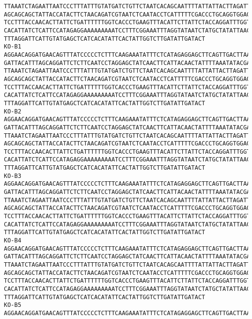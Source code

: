 \documentclass[11pt]{article}
\begin{document}
\begin{Verbatim}[commandchars=\\\{\}]
TTAAATCTAGAATTAATCCCTTTATTTGTATGATCTGTTCTAATCACAGCAATTTTATTATTACTTAGATTACCAGTCTT
AGCAGCAGCTATTACCATACTTCTAACAGATCGTAATCTCAATACCTCATTTTTCGACCCTGCAGGTGGAGGAGACCCAA
TCCTTTACCAACACTTATTCTGATTTTTTGGTCACCCTGAAGTTTACATTCTTATTCTACCAGGATTTGGTATTATTTCT
CACATTATCTCATTCCATAGAGGAAAAAAAAATCCTTTCGGAAATTTAGGTATAATCTATGCTATATTAACTATTGGAAT
TTTAGGATTCATTGTATGAGCTCATCACATATTCACTATTGGTCTTGATATTGATACT
KO-B1
AGGAACAGGATGAACAGTTTATCCCCCTCTTTCAAGAAATATTTCTCATAGAGGAGCTTCAGTTGACTTAAGAATCTTCA
GATTACATTTAGCAGGATTCTCTTCAATCCTAGGAGCTATCAACTTCATTACAACTATTTTAAATATACGACCAAAAAAC
TTAAATCTAGAATTAATCCCTTTATTTGTATGATCTGTTCTAATCACAGCAATTTTATTATTACTTAGATTACCAGTCTT
AGCAGCAGCTATTACCATACTTCTAACAGATCGTAATCTCAATACCTCATTTTTCGACCCTGCAGGTGGAGGAGACCCAA
TCCTTTACCAACACTTATTCTGATTTTTTGGTCACCCTGAAGTTTACATTCTTATTCTACCAGGATTTGGTATTATTTCT
CACATTATCTCATTCCATAGAGGAAAAAAAAATCCTTTCGGAAATTTAGGTATAATCTATGCTATATTAACTATTGGAAT
TTTAGGATTCATTGTATGAGCTCATCACATATTCACTATTGGTCTTGATATTGATACT
KO-B2
AGGAACAGGATGAACAGTTTATCCCCCTCTTTCAAGAAATATTTCTCATAGAGGAGCTTCAGTTGACTTAAGAATCTTCA
GATTACATTTAGCAGGATTCTCTTCAATCCTAGGAGCTATCAACTTCATTACAACTATTTTAAATATACGACCAAAAAAC
TTAAATCTAGAATTAATCCCTTTATTTGTATGATCTGTTCTAATCACAGCAATTTTATTATTACTTAGATTACCAGTCTT
AGCAGCAGCTATTACCATACTTCTAACAGATCGTAATCTCAATACCTCATTTTTCGACCCTGCAGGTGGAGGAGACCCAA
TCCTTTACCAACACTTATTCTGATTTTTTGGTCACCCTGAAGTTTACATTCTTATTCTACCAGGATTTGGTATTATTTCT
CACATTATCTCATTCCATAGAGGAAAAAAAAATCCTTTCGGAAATTTAGGTATAATCTATGCTATATTAACTATTGGAAT
TTTAGGATTCATTGTATGAGCTCATCACATATTCACTATTGGTCTTGATATTGATACT
KO-B3
AGGAACAGGATGAACAGTTTATCCCCCTCTTTCAAGAAATATTTCTCATAGAGGAGCTTCAGTTGACTTAAGAATCTTCA
GATTACATTTAGCAGGATTCTCTTCAATCCTAGGAGCTATCAACTTCATTACAACTATTTTAAATATACGACCAAAAAAC
TTAAATCTAGAATTAATCCCTTTATTTGTATGATCTGTTCTAATCACAGCAATTTTATTATTACTTAGATTACCAGTCTT
AGCAGCAGCTATTACCATACTTCTAACAGATCGTAATCTCAATACCTCATTTTTCGACCCTGCAGGTGGAGGAGACCCAA
TCCTTTACCAACACTTATTCTGATTTTTTGGTCACCCTGAAGTTTACATTCTTATTCTACCAGGATTTGGTATTATTTCT
CACATTATCTCATTCCATAGAGGAAAAAAAAATCCTTTCGGAAATTTAGGTATAATCTATGCTATATTAACTATTGGAAT
TTTAGGATTCATTGTATGAGCTCATCACATATTCACTATTGGTCTTGATATTGATACT
KO-B4
AGGAACAGGATGAACAGTTTATCCCCCTCTTTCAAGAAATATTTCTCATAGAGGAGCTTCAGTTGACTTAAGAATCTTCA
GATTACATTTAGCAGGATTCTCTTCAATCCTAGGAGCTATCAACTTCATTACAACTATTTTAAATATACGACCAAAAAAC
TTAAATCTAGAATTAATCCCTTTATTTGTATGATCTGTTCTAATCACAGCAATTTTATTATTACTTAGATTACCAGTCTT
AGCAGCAGCTATTACCATACTTCTAACAGATCGTAATCTCAATACCTCATTTTTCGACCCTGCAGGTGGAGGAGACCCAA
TCCTTTACCAACACTTATTCTGATTTTTTGGTCACCCTGAAGTTTACATTCTTATTCTACCAGGATTTGGTATTATTTCT
CACATTATCTCATTCCATAGAGGAAAAAAAAATCCTTTCGGAAATTTAGGTATAATCTATGCTATATTAACTATTGGAAT
TTTAGGATTCATTGTATGAGCTCATCACATATTCACTATTGGTCTTGATATTGATACT
KO-B5
AGGAACAGGATGAACAGTTTATCCCCCTCTTTCAAGAAATATTTCTCATAGAGGAGCTTCAGTTGACTTAAGAATCTTCA

\end{Verbatim}
\end{document}
